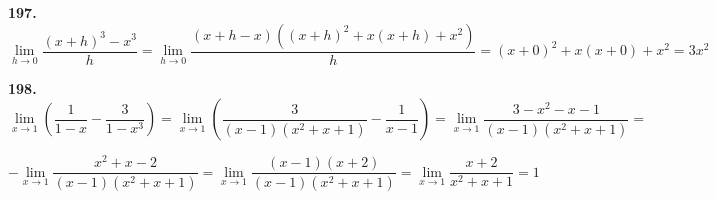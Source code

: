\documentclass[12pt]{article}
\begin{document}
	\medskip
	{\bf 197.} $\lim\limits_{h\to 0}\dfrac{(x+h)^3-x^3}{h} = \lim\limits_{h\to 0} \dfrac{(x+h-x)((x+h)^2+x(x+h)+x^2)}{h} = (x+0)^2+x(x+0)+x^2 = 3x^2$
	
	\medskip
	{\bf 198.} $\lim\limits_{x\to1}\left(\dfrac{1}{1-x}-\dfrac{3}{1-x^3}\right) = \lim\limits_{x\to1} \left(\dfrac{3}{(x-1)(x^2+x+1)}-\dfrac{1}{x-1}\right) = \lim\limits_{x\to1} \dfrac{3-x^2-x-1}{(x-1)(x^2+x+1)} = $
	
	$
	-\lim\limits_{x\to1} \dfrac{x^2+x-2}{(x-1)(x^2+x+1)} = \lim\limits_{x\to1} \dfrac{(x-1)(x+2)}{(x-1)(x^2+x+1)} = \lim\limits_{x\to1}\dfrac{x+2}{x^2+x+1} = 1
	$
	
	
	
	
\end{document}
